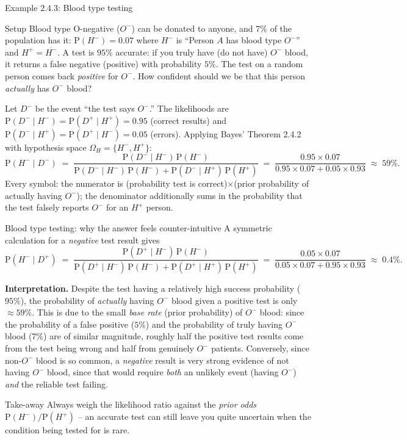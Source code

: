 \documentclass[aspectratio=169,10pt]{beamer}
\begin{document}
\begin{frame}{Example 2.4.3: Blood type testing}
  \begin{block}{Setup}
    Blood type O-negative ($O^-$) can be donated to anyone, and $7\%$ of the
    population has it: $\mathrm P(H^-)=0.07$ where $H^-$ is ``Person $A$ has
    blood type $O^-$'' and $H^+=\overline{H^-}$. A test is $95\%$ accurate:
    if you truly have (do not have) $O^-$ blood, it returns a false
    negative (positive) with probability $5\%$. The test on a random person
    comes back \emph{positive} for $O^-$. How confident should we be that
    this person \emph{actually} has $O^-$ blood?
  \end{block}

  Let $D^-$ be the event ``the test says $O^-$.'' The likelihoods are
  $\mathrm P(D^-\mid H^-)=\mathrm P(D^+\mid H^+)=0.95$ (correct results) and
  $\mathrm P(D^-\mid H^+)=\mathrm P(D^+\mid H^-)=0.05$ (errors). Applying
  Bayes' Theorem 2.4.2 with hypothesis space $\Omega_H=\{H^-,H^+\}$:
  \[
    \mathrm P(H^-\mid D^-) \;=\; \frac{\mathrm P(D^-\mid H^-)\,\mathrm P(H^-)}
        {\mathrm P(D^-\mid H^-)\,\mathrm P(H^-) + \mathrm P(D^-\mid H^+)\,\mathrm P(H^+)}
        \;=\; \frac{0.95\times 0.07}{0.95\times 0.07 + 0.05\times 0.93}
        \;\approx\; 59\%.
  \]
  Every symbol: the numerator is (probability test is correct)$\times$(prior
  probability of actually having $O^-$); the denominator additionally sums
  in the probability that the test falsely reports $O^-$ for an $H^+$ person.
\end{frame}

\begin{frame}{Blood type testing: why the answer feels counter-intuitive}
  A symmetric calculation for a \emph{negative} test result gives
  \[
    \mathrm P(H^-\mid D^+) \;=\; \frac{\mathrm P(D^+\mid H^-)\,\mathrm P(H^-)}
        {\mathrm P(D^+\mid H^-)\,\mathrm P(H^-) + \mathrm P(D^+\mid H^+)\,\mathrm P(H^+)}
        \;=\; \frac{0.05\times 0.07}{0.05\times 0.07 + 0.95\times 0.93}
        \;\approx\; 0.4\%.
  \]

  \textbf{Interpretation.} Despite the test having a relatively high success
  probability ($95\%$), the probability of \emph{actually} having $O^-$
  blood given a positive test is only $\approx 59\%$. This is due to the
  small \emph{base rate} (prior probability) of $O^-$ blood: since the
  probability of a false positive ($5\%$) and the probability of truly
  having $O^-$ blood ($7\%$) are of similar magnitude, roughly half the
  positive test results come from the test being wrong and half from
  genuinely $O^-$ patients. Conversely, since non-$O^-$ blood is so common,
  a \emph{negative} result is very strong evidence of not having $O^-$
  blood, since that would require \emph{both} an unlikely event (having
  $O^-$) \emph{and} the reliable test failing.

  \begin{block}{Take-away}
    Always weigh the likelihood ratio against the \emph{prior odds}
    $\mathrm P(H^-)/\mathrm P(H^+)$ -- an accurate test can still leave you
    quite uncertain when the condition being tested for is rare.
  \end{block}
\end{frame}
\end{document}
